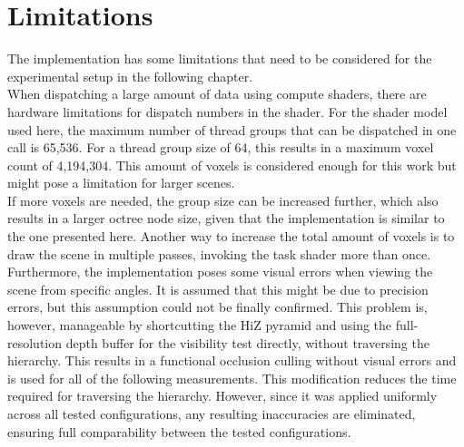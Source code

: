 \section{Limitations} \label{sec-implementation-limitations}

The implementation has some limitations that need to be considered for the experimental setup 
in the following chapter. \\

\noindent
When dispatching a large amount of data using compute shaders, there are hardware limitations for 
dispatch numbers in the shader. For the shader model used here, the maximum number of thread groups 
that can be dispatched in one call is 65,536. For a thread group size of 64, this results in a 
maximum voxel count of 4,194,304. This amount of voxels is considered enough for this work but 
might pose a limitation for larger scenes. \\

\noindent
If more voxels are needed, the group size can be increased further, which also results in a larger 
octree node size, given that the implementation is similar to the one presented here. Another way 
to increase the total amount of voxels is to draw the scene in multiple passes, invoking the task 
shader more than once. \\

\noindent
Furthermore, the implementation poses some visual errors when viewing the scene from specific 
angles. It is assumed that this might be due to precision errors, but this assumption could not 
be finally confirmed. This problem is, however, manageable by shortcutting the \ac{HiZ} pyramid 
and using the full-resolution depth buffer for the visibility test directly, without traversing 
the hierarchy. This results in a functional occlusion culling without visual errors and is used 
for all of the following measurements. This modification reduces the time required for traversing 
the hierarchy. However, since it was applied uniformly across all tested configurations, any 
resulting inaccuracies are eliminated, ensuring full comparability between the tested configurations. 
